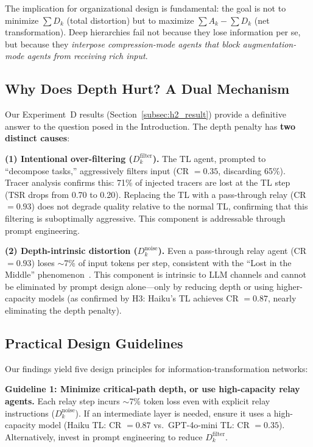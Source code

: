 \documentclass[conference]{IEEEtran}
\begin{document}
The implication for organizational design is fundamental: the goal is not to minimize $\sum D_k$ (total distortion) but to maximize $\sum A_k - \sum D_k$ (net transformation).
Deep hierarchies fail not because they lose information per se, but because they \emph{interpose compression-mode agents that block augmentation-mode agents from receiving rich input}.

\subsection{Why Does Depth Hurt? A Dual Mechanism}

Our Experiment~D results (Section~\ref{subsec:h2_result}) provide a definitive answer to the question posed in the Introduction.
The depth penalty has \textbf{two distinct causes}:

\textbf{(1) Intentional over-filtering ($D_k^{\text{filter}}$).}
The TL agent, prompted to ``decompose tasks,'' aggressively filters input (CR $= 0.35$, discarding 65\%).
Tracer analysis confirms this: 71\% of injected tracers are lost at the TL step (TSR drops from 0.70 to 0.20).
Replacing the TL with a pass-through relay (CR $= 0.93$) does not degrade quality relative to the normal TL, confirming that this filtering is suboptimally aggressive.
This component is addressable through prompt engineering.

\textbf{(2) Depth-intrinsic distortion ($D_k^{\text{noise}}$).}
Even a pass-through relay agent (CR $= 0.93$) loses $\sim$7\% of input tokens per step, consistent with the ``Lost in the Middle'' phenomenon~\cite{liu2024lost}.
This component is intrinsic to LLM channels and cannot be eliminated by prompt design alone---only by reducing depth or using higher-capacity models (as confirmed by H3: Haiku's TL achieves CR $= 0.87$, nearly eliminating the depth penalty).

\subsection{Practical Design Guidelines}

Our findings yield five design principles for information-transformation networks:

\textbf{Guideline 1: Minimize critical-path depth, or use high-capacity relay agents.}
Each relay step incurs $\sim$7\% token loss even with explicit relay instructions ($D_k^{\text{noise}}$).
If an intermediate layer is needed, ensure it uses a high-capacity model (Haiku TL: CR $= 0.87$ vs.\ GPT-4o-mini TL: CR $= 0.35$).
Alternatively, invest in prompt engineering to reduce $D_k^{\text{filter}}$.
\end{document}
